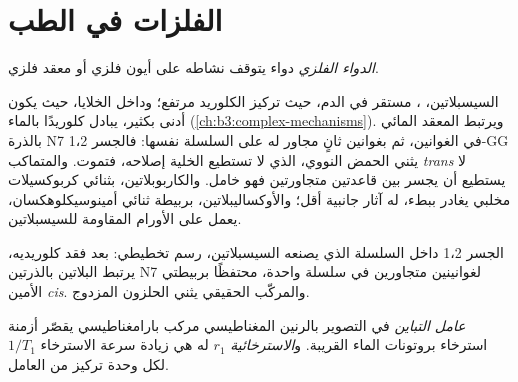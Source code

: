 \section{الفلزات في الطب}

\begin{definition}\label{def:b3:bioinorganic:metallodrug}
\emph{الدواء الفلزي} دواء يتوقف نشاطه على
أيون فلزي أو معقد فلزي.
\end{definition}

السيسبلاتين، ، مستقر في الدم، حيث تركيز الكلوريد
مرتفع؛ وداخل الخلايا، حيث يكون أدنى بكثير، يبادل كلوريدًا بالماء
(\cref{ch:b3:complex-mechanisms}). ويرتبط المعقد المائي بالذرة N7 في
الغوانين، ثم بغوانين ثانٍ مجاور له على السلسلة نفسها: فالجسر
1،2-GG يثني الحمض النووي، الذي لا تستطيع الخلية إصلاحه، فتموت. 
والمتماكب \textit{trans} لا يستطيع أن يجسر بين قاعدتين متجاورتين فهو خامل.
والكاربوبلاتين، بثنائي كربوكسيلات مخلبي يغادر ببطء، له آثار جانبية
أقل؛ والأوكساليبلاتين، بربيطة ثنائي أمينوسيكلوهكسان، يعمل على الأورام
المقاومة للسيسبلاتين.

\begin{omfigure}

{\small الجسر 1،2 داخل السلسلة الذي يصنعه السيسبلاتين، رسم تخطيطي: بعد
فقد كلوريديه، يرتبط البلاتين بالذرتين N7 لغوانينين متجاورين
في سلسلة واحدة، محتفظًا بربيطتي الأمين \textit{cis}. والمركّب الحقيقي
يثني الحلزون المزدوج.}
\end{omfigure}

\begin{definition}\label{def:b3:bioinorganic:contrast}
\emph{عامل التباين} في التصوير بالرنين المغناطيسي
مركب بارامغناطيسي يقصّر أزمنة استرخاء بروتونات الماء
القريبة. و\emph{الاسترخائية} $r_1$ له هي زيادة
سرعة الاسترخاء $1/T_1$ لكل وحدة تركيز من العامل.
\end{definition}

